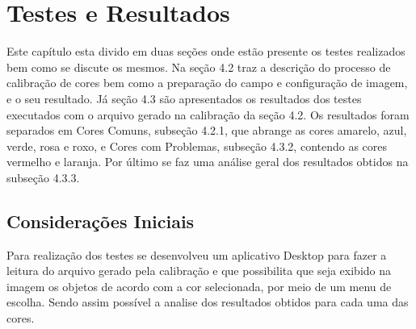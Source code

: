 % 
\chapter{Testes e Resultados} 
Este capítulo esta divido em duas seções onde est\~ao presente os testes realizados bem como se discute os mesmos. Na seção 4.2 traz a descrição do processo de calibração de cores bem como a preparação do campo e configuração de imagem, e o seu resultado. Já seção 4.3 são apresentados os resultados dos testes executados com o arquivo gerado na calibração da seção 4.2. Os resultados foram separados em Cores Comuns, subseção 4.2.1, que abrange as cores amarelo, azul, verde, rosa e roxo, e Cores com Problemas, subseção 4.3.2, contendo as cores vermelho e laranja. Por último se faz uma análise geral dos resultados obtidos na subseção 4.3.3.
\section{Considerações Iniciais}
 Para realização dos testes se desenvolveu um aplicativo Desktop para fazer a leitura do arquivo gerado pela calibração e que possibilita que seja exibido na imagem os objetos de acordo com a cor selecionada, por meio de um menu de escolha. Sendo assim possível a analise dos resultados obtidos para cada uma das cores. 
